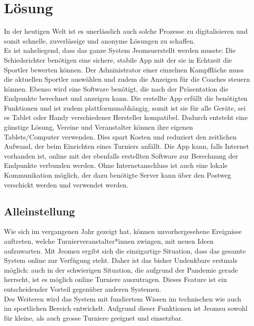 \section{Lösung}

In der heutigen Welt ist es unerlässlich auch solche Prozesse zu digitalisieren und somit schnelle,
    zuverlässige und anonyme Lösungen zu schaffen.
\\
Es ist naheliegend, dass das ganze System \grqq Jeomsu\grqq erstellt werden musste:
Die Schiedsrichter benötigen eine sichere, stabile App mit der sie in Echtzeit die Sportler bewerten können.
Der Administrator einer einzelnen Kampffläche muss die aktuellen Sportler auswählen und zudem die Anzeigen für die Coaches steuern können.
Ebenso wird eine Software benötigt, die nach der Präsentation die Endpunkte berechnet und anzeigen kann. 
Die erstellte App erfüllt die benötigten Funktionen und ist zudem plattformunabhängig, somit ist sie für alle Geräte,
    sei es Tablet oder Handy verschiedener Hersteller kompatibel.
Dadurch entsteht eine günstige Lösung, Vereine und Veranstalter können ihre eigenen Tablets/Computer verwenden.
Dies spart Kosten und reduziert den zeitlichen Aufwand, der beim Einrichten eines Turniers anfällt.
Die App kann, falls Internet vorhanden ist, online mit der ebenfalls erstellten Software zur Berechnung der Endpunkte verbunden werden.
Ohne Internetanschluss ist auch eine lokale Kommunikation möglich, der dazu benötigte Server kann über den
    Postweg verschickt werden und verwendet werden.

\subsection{Alleinstellung}


Wie sich im vergangenen Jahr gezeigt hat, können unvorhergesehene Ereignisse auftreten, welche Turnierveranstalter*innen
    zwingen, mit neuen Ideen aufzuwarten.
Mit Jeomsu ergibt sich die einzigartige Situation, dass das gesamte System online zur Verfügung steht.
Daher ist das bisher Undenkbare erstmals möglich: auch in der schwierigen Situation, die aufgrund der Pandemie gerade
herrscht, ist es möglich online Turniere auszutragen.
Dieses Feature ist ein entscheidender Vorteil gegenüber anderen Systemen.
\\
Des Weiteren wird das System mit fundiertem Wissen im technischen wie auch im sportlichen Bereich entwickelt.
Aufgrund dieser Funktionen ist Jeomsu sowohl für kleine, als auch grosse Turniere geeignet und einsetzbar.

